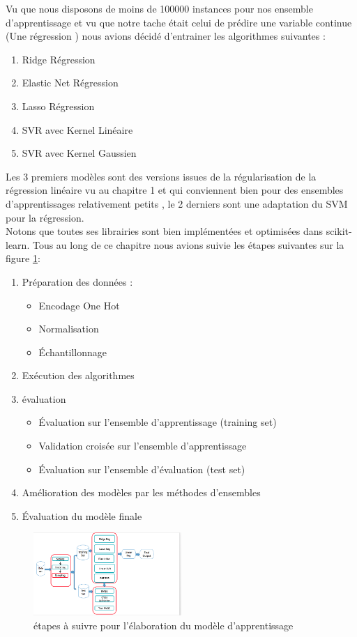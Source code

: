 Vu que nous disposons de moins de 100000 instances pour nos ensemble d'apprentissage et vu que notre tache était celui de prédire une variable continue (Une régression )  nous avions décidé d'entrainer les algorithmes  suivantes :
\begin{enumerate}
	\item Ridge Régression
	\item Elastic Net Régression
	\item Lasso Régression
	\item \ac{SVR} avec Kernel Linéaire
	\item  \ac{SVR} avec Kernel Gaussien 
\end{enumerate}
Les 3 premiers modèles sont des versions issues de la régularisation de la régression linéaire vu au chapitre 1  et qui conviennent bien pour des ensembles d'apprentissages relativement petits , le 2 derniers sont une adaptation du \ac{SVM} pour la régression.\\
Notons que toutes ses librairies sont bien implémentées et optimisées dans scikit-learn.
Tous au long de ce chapitre nous avions suivie les étapes suivantes  sur la figure \ref{fig:predictiveModelBuilding}:
 \begin{enumerate}
 \item Préparation des données :
 \begin{itemize}
 	\item  Encodage One Hot
 	\item  Normalisation
 	\item  Échantillonnage
 \end{itemize}
\item Exécution des algorithmes
\item évaluation 
   \begin{itemize}
  	\item  Évaluation sur l'ensemble d'apprentissage (training set)
  	\item  Validation croisée sur l'ensemble d'apprentissage
  	\item  Évaluation sur l'ensemble d'évaluation (test set) 
  \end{itemize}
\item Amélioration des modèles par les méthodes d'ensembles
\item Évaluation du modèle finale
 \end{enumerate}
\begin{figure}[ht]
	\centering
	\includegraphics[width=0.5\textwidth]{fig/ModelBuilding.png}
	\caption{étapes à suivre pour l'élaboration du modèle d'apprentissage }
	\label{fig:predictiveModelBuilding}
\end{figure} 
